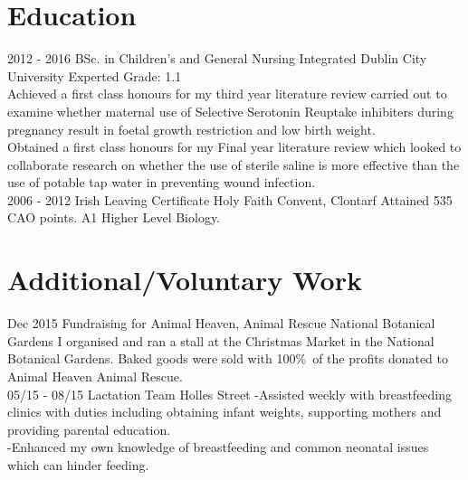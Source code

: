 \documentclass[]{friggeri-cv}
\begin{document}
\section{Education}
\begin{entrylist}
  \entry
    {2012 - 2016}
    {BSc. in Children’s and General Nursing Integrated}
    {Dublin City University}
    {Experted Grade: 1.1\\
Achieved a first class honours for my third year literature review carried out to examine whether maternal use of Selective Serotonin Reuptake inhibiters during pregnancy result in foetal growth restriction and low birth weight.\\
Obtained a first class honours for my Final year literature review which looked to collaborate research on whether the use of sterile saline is more effective than the use of potable tap water in preventing wound infection.
\\}
  \entry
    {2006 - 2012}
    {Irish Leaving Certificate}
    {Holy Faith  Convent, Clontarf}
    {Attained 535 CAO points. A1 Higher Level Biology.}
\end{entrylist}

\newpage

\section{Additional/Voluntary Work}
\begin{entrylist}
  \entry
    {Dec 2015}
    {Fundraising for Animal Heaven, Animal Rescue}
    {National Botanical Gardens}
    {I organised and ran a stall at the Christmas Market in the National Botanical Gardens. Baked goods were sold with 100\%\ of the profits donated to Animal Heaven Animal Rescue.\\}
  \entry
    {05/15 - 08/15}
    {Lactation Team}
    {Holles Street}
    {-Assisted weekly with breastfeeding clinics with duties including obtaining infant weights, supporting mothers and providing parental education. \\
 -Enhanced my own knowledge of breastfeeding and common neonatal issues which can
hinder feeding.\\
}
\end{entrylist}
\end{document}
